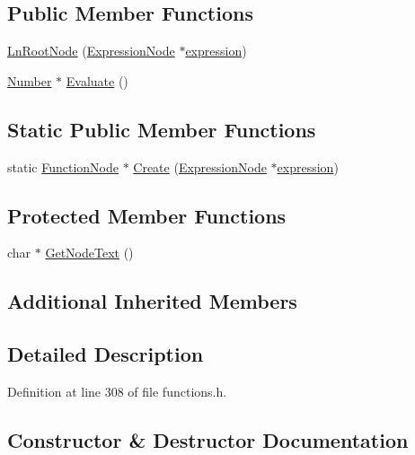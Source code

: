 \subsection*{Public Member Functions}
\begin{DoxyCompactItemize}
\item 
\hyperlink{classLnRootNode_a4424f5992bbad7bc9787c6b13f12b020}{Ln\+Root\+Node} (\hyperlink{classExpressionNode}{Expression\+Node} $\ast$\hyperlink{classFunctionNode_ad7577b179a1937aaf8a0058bb5b546dc}{expression})
\item 
\hyperlink{structNumber}{Number} $\ast$ \hyperlink{classLnRootNode_a549db364d3661c94bb9edb587d191439}{Evaluate} ()
\end{DoxyCompactItemize}
\subsection*{Static Public Member Functions}
\begin{DoxyCompactItemize}
\item 
static \hyperlink{classFunctionNode}{Function\+Node} $\ast$ \hyperlink{classLnRootNode_a4d634842fba548eabb422ee40032bac6}{Create} (\hyperlink{classExpressionNode}{Expression\+Node} $\ast$\hyperlink{classFunctionNode_ad7577b179a1937aaf8a0058bb5b546dc}{expression})
\end{DoxyCompactItemize}
\subsection*{Protected Member Functions}
\begin{DoxyCompactItemize}
\item 
char $\ast$ \hyperlink{classLnRootNode_a6a222d2d605103fe7a6c5d25512d62ce}{Get\+Node\+Text} ()
\end{DoxyCompactItemize}
\subsection*{Additional Inherited Members}


\subsection{Detailed Description}


Definition at line 308 of file functions.\+h.



\subsection{Constructor \& Destructor Documentation}

